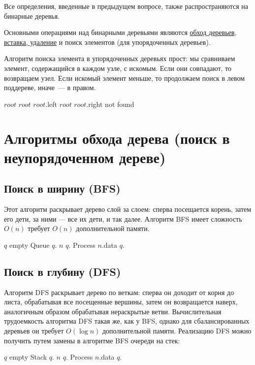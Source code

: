 Все определения, введенные в предыдущем вопросе, также распространяются на бинарные деревья.

Основными операциями над бинарными деревьями являются \hyperref[sec:bintree-traversal]{обход деревьев},
\hyperref[sec:tree-ins-del]{вставка, удаление} и поиск элементов (для упорядоченных деревьев).

\label{alg:bst-search}
Алгоритм поиска элемента в упорядоченных деревьях прост: мы сравниваем элемент, содержащийся в каждом узле,
с искомым. Если они совпадают, то возвращаем узел. Если искомый элемент меньше, то продолжаем поиск в левом
поддереве, иначе~--- в правом.
\begin{algorithmic}
      \State \Return $root$
      \State $root$ \asgn $root$.left
    \Else
      \State $root$ \asgn $root$.right
    \EndIf
  \EndWhile
  \State \Return not found
\EndFunction
\end{algorithmic}

\section{Алгоритмы обхода дерева (поиск в неупорядоченном дереве)}
\label{sec:tree-traversal}

\subsection{Поиск в ширину (BFS)}
Этот алгоритм раскрывает дерево слой за слоем:
сперва посещается корень, затем его дети, за ними ---
все их дети, и так далее. Алгоритм BFS имеет сложность $O(n)$ требует
$O(n)$ дополнительной памяти.
\begin{algorithmic}
  \State $q$ \asgn empty Queue
  \State $q$.
    \State $n$ \asgn $q$.
    \State Process $n$.data
      $q$.
    \EndFor
  \EndWhile
\EndProcedure
\end{algorithmic}

\subsection{Поиск в глубину (DFS)}
Алгоритм DFS раскрывает дерево по веткам: сперва он доходит от корня до листа,
обрабатывая все посещенные вершины, затем он возвращается наверх, аналогичным
образом обрабатывая нераскрытые ветви. Вычислительная трудоемкость алгоритма
DFS такая же, как у BFS, однако для сбалансированных деревьев он требует $O(\log n)$
дополнительной памяти.
Реализацию DFS можно получить путем замены в алгоритме BFS очереди на стек:
\begin{algorithmic}
  \State $q$ \asgn empty Stack
  \State $q$.
    \State $n$ \asgn $q$.
    \State Process $n$.data
      $q$.
    \EndFor
  \EndWhile
\EndProcedure
\end{algorithmic}

